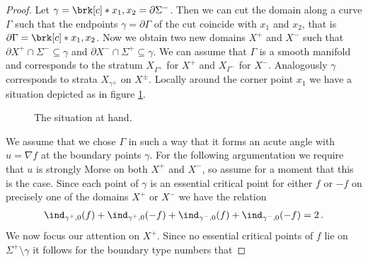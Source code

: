 \begin{proof}
  Let $\gamma=\brk[c]*{x_1,x_2}=\partial\Sigma^-$.
  Then we can cut the domain along a curve $\Gamma$ such that the endpoints $\gamma=\partial\Gamma$
  of the cut coincide with $x_1$ and $x_2$, that is $\partial\Gamma=\brk[c]*{x_1,x_2}$.
  Now we obtain two new domains $X^+$ and $X^-$ such that $\partial X^+\cap\Sigma^-\subseteq\gamma$ and
  $\partial X^-\cap\Sigma^+\subseteq\gamma$. We can assume that $\Gamma$ is a smooth manifold and corresponds to the stratum 
  $X_{\Gamma^+}$ for $X^+$ and $X_{\Gamma^-}$ for $X^-$.
  Analogously $\gamma$ corresponds to strata $X_{\gamma^\pm}$ on $X^\pm$.
  Locally around the corner point $x_1$ we have a situation depicted as in figure \ref{fi:n2_cutOmega_flowthrough}.
  \begin{figure} 
    \centering
    
    \caption{The situation at hand.}
    \label{fi:n2_cutOmega_flowthrough}
  \end{figure}
  We assume that we chose $\Gamma$ in such a way that it forms an acute angle with $u=\nabla f$ at the boundary points $\gamma$.
  For the following argumentation we require that $u$ is strongly Morse on both $X^+$ and $X^-$, so assume for a moment that this
  is the case.
  Since each point of $\gamma$ is an essential critical point for either $f$ or $-f$ on precisely one of the domains $X^+$ or $X^-$ we have
  the relation
  \begin{align}
    \ind_{\gamma^+,0}(f)+\ind_{\gamma^+,0}(-f)+\ind_{\gamma^-,0}(f)+\ind_{\gamma^-,0}(-f)=2\,.\label{eq:n2_disproof_morse_relgamma}
  \end{align}
  We now focus our attention on $X^+$. Since no essential critical points of $f$ lie on $\Sigma^+\setminus\gamma$
  it follows for the boundary type numbers that

\end{proof}
